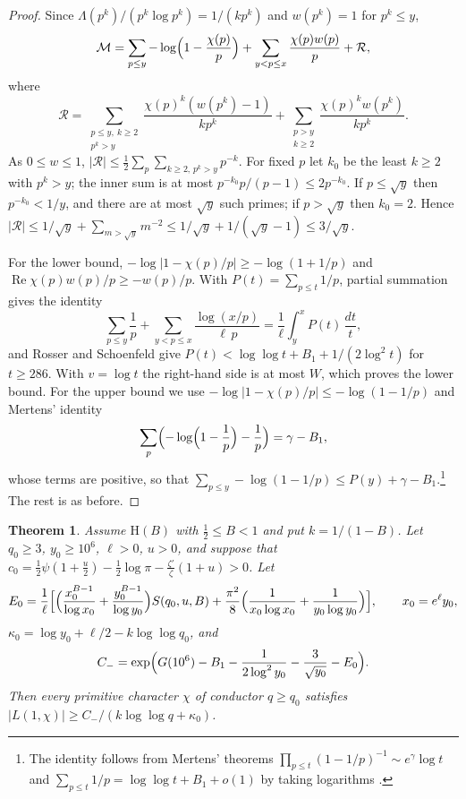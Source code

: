 \documentclass[11pt]{amsart}
\newtheorem{theorem}{Theorem}[section]
\theoremstyle{definition}
\theoremstyle{remark}
\numberwithin{equation}{section}
\renewcommand{\Re}{\operatorname{Re}}
\newcommand{\Hyp}{\mathrm{H}}
\begin{document}
\begin{proof}
Since $\Lambda(p^k)/(p^k\log p^k)=1/(kp^k)$ and $w(p^k)=1$ for $p^k\le y$,
\[
\mathcal M=\sum_{p\le y}-\log\Bigl(1-\frac{\chi(p)}p\Bigr)+\sum_{y<p\le x}\frac{\chi(p)w(p)}p+\mathcal R,
\]
where
\[
\mathcal R=\sum_{\substack{p\le y,\ k\ge2\\ p^k>y}}\frac{\chi(p)^k(w(p^k)-1)}{kp^k}+\sum_{\substack{p>y\\ k\ge2}}\frac{\chi(p)^kw(p^k)}{kp^k}.
\]
As $0\le w\le1$, $|\mathcal R|\le\frac12\sum_p\sum_{k\ge2,\,p^k>y}p^{-k}$. For fixed $p$ let $k_0$ be the least $k\ge2$ with $p^k>y$; the inner sum is at most $p^{-k_0}p/(p-1)\le2p^{-k_0}$. If $p\le\sqrt y$ then $p^{-k_0}<1/y$, and there are at most $\sqrt y$ such primes; if $p>\sqrt y$ then $k_0=2$. Hence $|\mathcal R|\le1/\sqrt y+\sum_{m>\sqrt y}m^{-2}\le1/\sqrt y+1/(\sqrt y-1)\le3/\sqrt y$.

For the lower bound, $-\log|1-\chi(p)/p|\ge-\log(1+1/p)$ and $\Re\chi(p)w(p)/p\ge-w(p)/p$. With $P(t)=\sum_{p\le t}1/p$, partial summation gives the identity
\[
\sum_{p\le y}\frac1p+\sum_{y<p\le x}\frac{\log(x/p)}{\ell\,p}=\frac1\ell\int_y^xP(t)\,\frac{dt}t ,
\]
and Rosser and Schoenfeld \cite[(3.18)]{RS62} give $P(t)<\log\log t+B_1+1/(2\log^2t)$ for $t\ge286$. With $v=\log t$ the right-hand side is at most $W$, which proves the lower bound. For the upper bound we use $-\log|1-\chi(p)/p|\le-\log(1-1/p)$ and Mertens' identity
\[
\sum_p\Bigl(-\log\Bigl(1-\frac1p\Bigr)-\frac1p\Bigr)=\gamma-B_1,
\]
whose terms are positive, so that $\sum_{p\le y}-\log(1-1/p)\le P(y)+\gamma-B_1$.\footnote{The identity follows from Mertens' theorems $\prod_{p\le t}(1-1/p)^{-1}\sim e^\gamma\log t$ and $\sum_{p\le t}1/p=\log\log t+B_1+o(1)$ by taking logarithms \cite[Theorem 2.7]{MV07}.} The rest is as before.
\end{proof}

\begin{theorem}\label{thm:uniform}
Assume $\Hyp(B)$ with $\tfrac12\le B<1$ and put $k=1/(1-B)$. Let $q_0\ge3$, $y_0\ge10^6$, $\ell>0$, $u>0$, and suppose that
$c_0=\frac12\psi(1+\frac u2)-\frac12\log\pi-\frac{\zeta'}{\zeta}(1+u)>0$. Let
\[
E_0=\frac1\ell\Bigl[\Bigl(\frac{x_0^{B-1}}{\log x_0}+\frac{y_0^{B-1}}{\log y_0}\Bigr)S(q_0,u,B)+\frac{\pi^2}{8}\Bigl(\frac1{x_0\log x_0}+\frac1{y_0\log y_0}\Bigr)\Bigr],\qquad x_0=e^\ell y_0,
\]
$\kappa_0=\log y_0+\ell/2-k\log\log q_0$, and
\[
C_-=\exp\Bigl(G(10^6)-B_1-\frac1{2\log^2y_0}-\frac3{\sqrt{y_0}}-E_0\Bigr).
\]
Then every primitive character $\chi$ of conductor $q\ge q_0$ satisfies $|L(1,\chi)|\ge C_-/(k\log\log q+\kappa_0)$.
\end{theorem}
\end{document}
